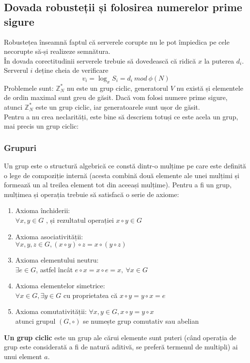 \documentclass[12]{report}
\begin{document}
\subsection{Dovada robusteții și folosirea numerelor prime sigure}
Robustețea înseamnă faptul că serverele corupte nu le pot împiedica pe cele necorupte să-și realizeze semnătura. \\
În dovada corectitudinii serverele trebuie să dovedească că ridică $x$ la puterea $d_i$. Serverul $i$ deține cheia de verificare
$$ v_i = \log_{x} S_i = d_i \ mod \ \phi(N)$$
Problemele sunt: $\mathbb{Z}_{N}^{*}$ nu este un grup ciclic,  generatorul $V$ nu există și elementele de ordin maximal sunt greu de găsit. Dacă vom folosi numere prime sigure, atunci $\mathbb{Z}_{N}^{*}$ este un grup ciclic, iar generatoarele sunt ușor de găsit. \\
Pentru a nu crea neclarități, este bine să descriem totuși ce este acela un grup, mai precis un grup ciclic: 
\subsubsection{Grupuri}
Un grup este o structură algebrică ce constă dintr-o mulțime pe care este definită o lege de compoziție internă (acesta combină două elemente ale unei mulțimi și formează un al treilea element tot din aceeași mulțime). Pentru a fi un grup, mulțimea și operația trebuie să satisfacă o serie de axiome:
\begin{enumerate}
\item Axioma închiderii: \\
$\forall x,  y \in G$  , și rezultatul operației $x \circ y \in G$

\item Axioma asociativității: \\
$\forall x,y,z \in G, (x \circ y) \circ z = x \circ (y \circ z)$

\item Axioma elementului neutru: \\
$\exists e \in G$, astfel încât $e \circ x = x \circ e = x, \ \forall x \in G$

\item Axioma elementelor simetrice: \\
$\forall x \in G, \exists y \in G$ cu proprietatea că $x \circ y = y \circ x = e$

\item Axioma comutativității:
$\forall x,y \in G, x \circ y = y \circ x$ \\
atunci grupul $(G,\circ )$ se numește grup comutativ sau abelian



\end{enumerate}
\textbf{Un grup ciclic} este un grup ale cărui elemente sunt puteri (când operația de grup este considerată a fi de natură aditivă, se preferă termenul de multipli) ai unui element $a$. 
\end{document}
